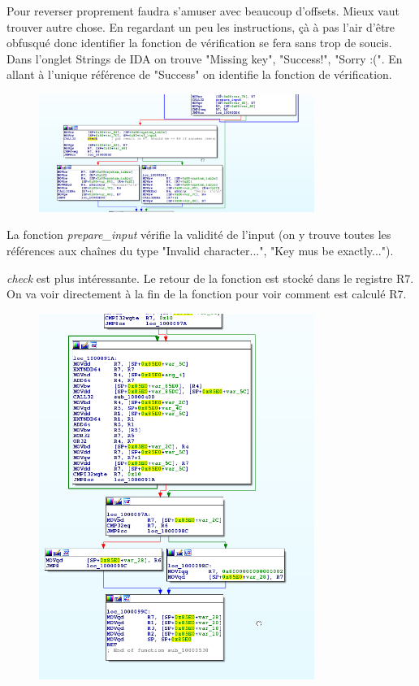 \documentclass[14pt]{article}
\begin{document}
Pour reverser proprement faudra s'amuser avec beaucoup d'offsets. Mieux vaut trouver autre chose.
En regardant un peu les instructions, çà à pas l'air d'être obfusqué donc identifier la fonction de vérification se fera sans trop de soucis.
Dans l'onglet Strings de IDA on trouve "Missing key", "Success!", "Sorry :(". En allant à l'unique référence de "Success" on identifie la fonction de vérification.
\begin{figure}[H]
\includegraphics[width=0.8\textwidth]{./challs/part2/efi/img_check.png}
\centering
\end{figure}

La fonction {\em prepare\_input} vérifie la validité de l'input (on y trouve toutes les références aux chaînes du type "Invalid character...", "Key mus be exactly...").

{\em check} est plus intéressante. Le retour de la fonction est stocké dans le registre R7.
On va voir directement à la fin de la fonction pour voir comment est calculé R7.

\begin{figure}[H]
\includegraphics[width=0.8\textwidth]{./challs/part2/efi/img_loop.png}
\centering
\end{figure}
\end{document}

